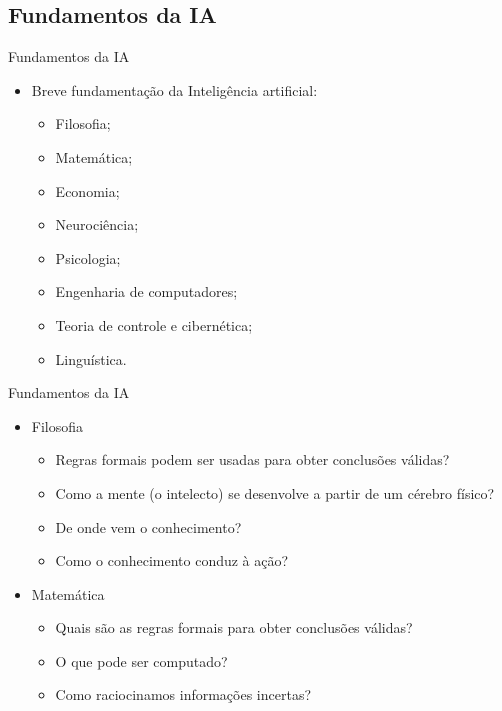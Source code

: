 \documentclass{libs/ufc_format}
\begin{document}
\subsection{Fundamentos da IA}

\begin{frame}{Fundamentos da IA}
    \begin{itemize}
        \justifying
        \item Breve fundamentação da Inteligência artificial:
            \begin{itemize}
                \item<2> Filosofia;
                \item<2> Matemática;
                \item<2> Economia;
                \item<2> Neurociência;
                \item<2> Psicologia;
                \item<2> Engenharia de computadores;
                \item<2> Teoria de controle e cibernética;
                \item<2> Linguística.
            \end{itemize}
    \end{itemize}
\end{frame}

\begin{frame}{Fundamentos da IA}
    \begin{itemize}
        \justifying
        \item Filosofia
            \begin{itemize}
                \justifying
                \item<1> Regras formais podem ser usadas para obter conclusões válidas?
                \item<1> Como a mente (o intelecto) se desenvolve a partir de um cérebro físico?
                \item<1> De onde vem o conhecimento?
                \item<1> Como o conhecimento conduz à ação?
            \end{itemize}
        \item<2-> Matemática
            \begin{itemize}
                \justifying
                \item<2> Quais são as regras formais para obter conclusões válidas?
                \item<2> O que pode ser computado?
                \item<2> Como raciocinamos informações incertas?
            \end{itemize}
    \end{itemize}
\end{frame}
\end{document}
